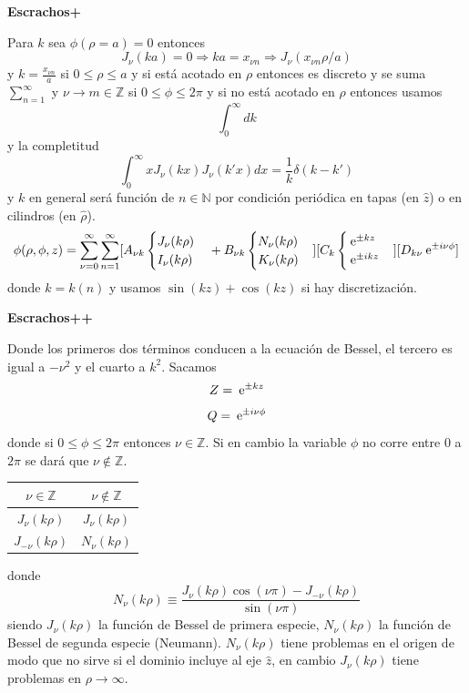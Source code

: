 \documentclass[10pt,oneside]{CBFT_book}
\begin{document}
{\bf Escrachos+}


Para $k$ sea $\phi(\rho=a)=0$ entonces 
\[
	J_\nu(ka) = 0 \Rightarrow ka=x_{\nu n} \Rightarrow J_\nu (x_{\nu n} \rho/a)
\]
y $k=\frac{x_{\nu n}}{a}$ si $0\leq \rho \leq a$ y si está acotado en $\rho$ entonces es discreto y se
suma $\sum_{n=1}^\infty$ y $\nu\to m \in \mathbb{Z}$ si $0 \leq \phi \leq 2\pi$ y si no está acotado en
$\rho$ entonces usamos 
\[
	\int_0^\infty dk
\]
y la completitud
\[
	\int_0^\infty x J_\nu(kx) J_\nu(k'x) dx = \frac{1}{k} \delta (k-k')
\]
y $k$ en general será función de $n\in \mathbb{N}$ por condición periódica en tapas (en $\hat{z}$) o en
cilindros (en $\hat{\rho}$).
\[
	\phi(\rho,\phi,z) = \sum_{\nu=0}^\infty \sum_{n=1}^\infty
	[A_{\nu k}\begin{cases} J_\nu(k\rho)  \\ I_\nu(k\rho) \end{cases} + 
	B_{\nu k} \begin{cases} N_\nu(k\rho)  \\ K_\nu(k\rho) \end{cases} ]
	[C_k \begin{cases} \:\mathrm{e}^{\pm kz} \\ \:\mathrm{e}^{\pm ikz} \end{cases}]
	[D_{k\nu} \:\mathrm{e}^{\pm i \nu \phi}]
\]
donde $k=k(n)$ y usamos $\sin(kz)+\cos(kz)$ si hay discretización.

{\bf Escrachos++}

Donde los primeros dos términos conducen a la ecuación de Bessel, el tercero es igual a $-\nu^2$ y el
cuarto a $k^2$. Sacamos
\[
	Z = \:\mathrm{e}^{\pm kz}
\]
\[
	Q = \:\mathrm{e}^{\pm i \nu \phi}
\]
donde si $0\leq \phi \leq 2\pi$ entonces $\nu \in \mathbb{Z}$. Si en cambio la variable $\phi$ no corre 
entre $0$ a $2\pi$ se dará que $\nu \notin \mathbb{Z}$.

\begin{center}
	\begin{tabular}{|c|c|}
	\hline
	$ \nu \in \mathbb{Z} $ & $ \nu \notin \mathbb{Z}  $ \\
	\hline
	$J_\nu(k\rho)$ & $J_\nu(k\rho)$ \\
	$J_{-\nu}(k\rho)$ & $N_\nu(k\rho)$ \\
	\hline
	\end{tabular} 
\end{center}
donde 
\[
	N_\nu(k\rho) \equiv \frac{ J_\nu(k\rho) \cos(\nu\pi) - J_{-\nu}(k\rho)}{\sin(\nu\pi)}
\]
siendo $J_\nu(k\rho)$ la función de Bessel de primera especie, $N_\nu(k\rho)$ la función de Bessel de segunda 
especie (Neumann).
$N_\nu(k\rho)$ tiene problemas en el origen de modo que no sirve si el dominio incluye al eje $\hat{z}$, en 
cambio $J_\nu(k\rho)$ tiene problemas en $\rho\to \infty$.

\end{document}
